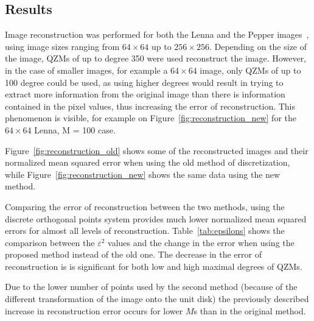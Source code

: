 \subsection{Results}
Image reconstruction was performed for both the Lenna and the Pepper images~\cite{usc_sipi}, using image sizes ranging from $64\times 64$ up to $256 \times 256$. Depending on the size of the image, QZMs of up to degree 350 were used reconstruct the image. However, in the case of smaller images, for example a $64\times 64$ image, only QZMs of up to 100 degree could be used, as using higher degrees would result in trying to extract more information from the original image than there is information contained in the pixel values, thus increasing the error of reconstruction. This phenomenon is visible, for example on Figure~\ref{fig:reconstruction_new} for the $64 \times 64$ Lenna, M = 100 case.

Figure~\ref{fig:reconstruction_old} shows some of the reconstructed images and their normalized mean squared error when using the old method of discretization, while Figure~\ref{fig:reconstruction_new} shows the same data using the new method.

Comparing the error of reconstruction between the two methods, using the discrete orthogonal points system provides much lower normalized mean squared errors for almost all levels of reconstruction. 
Table~\ref{tab:epsilons} shows the comparison between the $\varepsilon^2$ values and the change in the error when using the proposed method instead of the old one. The decrease in the error of reconstruction is is significant for both low and high maximal degrees of QZMs. 

Due to the lower number of points used by the second method (because of the different transformation of the image onto the unit disk) the previously described increase in reconstruction error occurs for lower $M$s than in the original method.


